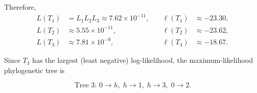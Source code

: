 Therefore,
\[
    \begin{aligned}
        L(T_1) & = L_1 L_2 L_3 \approx 7.62\times10^{-11},
               & \quad \ell(T_1)                           & \approx -23.30, \\
        L(T_2) & \approx 5.55\times10^{-11},
               & \quad \ell(T_2)                           & \approx -23.62, \\
        L(T_3) & \approx 7.81\times10^{-9},
               & \quad \ell(T_3)                           & \approx -18.67.
    \end{aligned}
\]

Since $T_3$ has the largest (least negative) log-likelihood,
the maximum-likelihood phylogenetic tree is

\[
    \boxed{\text{Tree 3: } 0 \to h,\; h \to 1,\; h \to 3,\; 0 \to 2.}
\]
